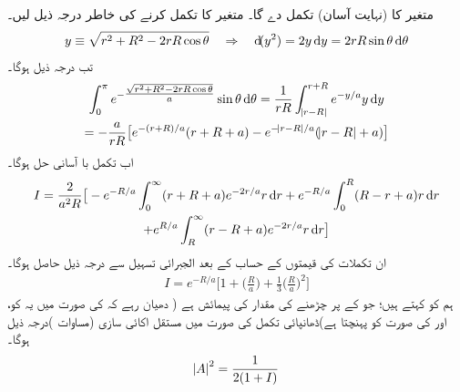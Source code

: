  متغیر  کا (نہایت آسان) تکمل  دے گا۔ متغیر  کا تکمل کرنے کی خاطر درجہ ذیل لیں۔
\begin{align*}
y\equiv\sqrt{r^{2}+R^{2}-2rR\cos{\theta}}\quad \Rightarrow \quad \dif (y^{2})=2y\dif y=2rR\sin{\theta}\dif \theta
\end{align*}
 تب درجہ ذیل ہوگا۔
\begin{multline*}
\int_{0}^{\pi}e^{-\tfrac{\sqrt{r^{2}+R^{2}-2rR\cos{\theta}}}{a}}\sin{\theta}\dif \theta=\frac{1}{rR}\int_{\abs{r-R}}^{r+R}e^{-y/a}y\dif y\\
=-\frac{a}{rR}\big[e^{-(r+R)/a}(r+R+a)-e^{-\abs{r-R}/a}(\abs{r-R}+a)\big]
\end{multline*}
 اب تکمل  با آسانی حل ہوگا۔ 
\begin{multline*}
I=\frac{2}{a^{2}R}\big[-e^{-R/a}\int_{0}^{\infty}(r+R+a)e^{-2r/a}r\dif r+e^{-R/a}\int_{0}^{R}(R-r+a)r\dif r\\
+e^{R/a}\int_{R}^{\infty}(r-R+a)e^{-2r/a}r\dif r\big]
\end{multline*}
 ان تکملات کی قیمتوں کے حساب کے بعد الجبرائی تسہیل سے درجہ ذیل حاصل ہوگا۔
\begin{align}
I=e^{-R/a}\big[1+\big(\frac{R}{a}\big)+\frac{1}{3}\big(\frac{R}{a}\big)^{2}\big]
\end{align}
ہم  کو  کہتے ہیں؛ جو  کے  پر چڑھنے کی مقدار کی پیمائش ہے ( دھیان رہے کہ  کی صورت میں یہ  کو، اور  کی صورت  کو پہنچتا ہے)ڈھانپائی تکمل  کی صورت میں مستقل اکائی سازی (مساوات )درجہ ذیل ہوگا۔
\begin{align}
\abs{A}^{2}=\frac{1}{2(1+I)} 
\end{align}

